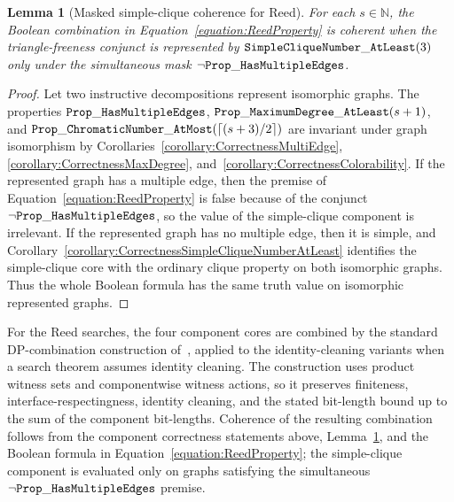 \documentclass[11pt,a4paper]{article}
\newtheorem{lemma}[theorem]{Lemma}
\newcommand{\N}{\mathbb{N}}
\newcommand{\dpNamePart}[1]{\mbox{\normalfont\ttfamily #1}}
\newcommand{\hasMultiEdgeProperty}{\dpNamePart{Prop}\_\allowbreak\dpNamePart{HasMultipleEdges}}
\newcommand{\maxDegreeAtLeastProperty}[1]{\dpNamePart{Prop}\_\allowbreak\dpNamePart{MaximumDegree}\_\allowbreak\dpNamePart{AtLeast}(#1)}
\newcommand{\chromaticNumberAtMostProperty}[1]{\dpNamePart{Prop}\_\allowbreak\dpNamePart{ChromaticNumber}\_\allowbreak\dpNamePart{AtMost}(#1)}
\newcommand{\simpleCliqueNumberAtLeastCore}[1]{\dpNamePart{SimpleCliqueNumber}\_\allowbreak\dpNamePart{AtLeast}(#1)}
\begin{document}
\begin{lemma}[Masked simple-clique coherence for Reed]
\label{lemma:masked-simple-clique-coherence}
For each $s\in\N$, the Boolean combination in Equation~\eqref{equation:ReedProperty} is coherent when the triangle-freeness conjunct is represented by $\simpleCliqueNumberAtLeastCore{3}$ only under the simultaneous mask $\neg\hasMultiEdgeProperty$.
\end{lemma}
\begin{proof}
Let two instructive decompositions represent isomorphic graphs. The properties
$\hasMultiEdgeProperty$, $\maxDegreeAtLeastProperty{s+1}$, and
$\chromaticNumberAtMostProperty{\lceil(s+3)/2\rceil}$ are invariant under graph
isomorphism by Corollaries~\ref{corollary:CorrectnessMultiEdge},
\ref{corollary:CorrectnessMaxDegree}, and~\ref{corollary:CorrectnessColorability}.
If the represented graph has a multiple edge, then the premise of
Equation~\eqref{equation:ReedProperty} is false because of the conjunct
$\neg\hasMultiEdgeProperty$, so the value of the simple-clique component is
irrelevant. If the represented graph has no multiple edge, then it is simple,
and Corollary~\ref{corollary:CorrectnessSimpleCliqueNumberAtLeast} identifies
the simple-clique core with the ordinary clique property on both isomorphic
graphs. Thus the whole Boolean formula has the same truth value on isomorphic
represented graphs.
\end{proof}

For the Reed searches, the four component cores are combined by the standard DP-combination construction of~\cite{de2023width}, applied to the identity-cleaning variants when a search theorem assumes identity cleaning. The construction uses product witness sets and componentwise witness actions, so it preserves finiteness, interface-respectingness, identity cleaning, and the stated bit-length bound up to the sum of the component bit-lengths. Coherence of the resulting combination follows from the component correctness statements above, Lemma~\ref{lemma:masked-simple-clique-coherence}, and the Boolean formula in Equation~\eqref{equation:ReedProperty}; the simple-clique component is evaluated only on graphs satisfying the simultaneous $\neg\hasMultiEdgeProperty$ premise.
\end{document}
